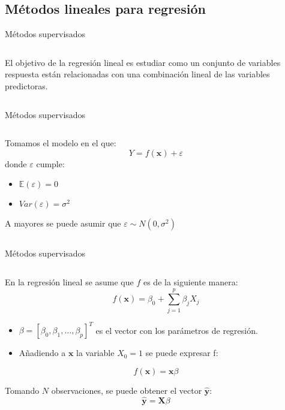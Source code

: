 \subsection{Métodos lineales para regresión}
\begin{frame}{Métodos supervisados}
\begin{columns}
\begin{column}{0.9\textwidth}
El objetivo de la regresión lineal es estudiar como un conjunto de variables respuesta están relacionadas con una combinación lineal de las variables predictoras. 
\end{column}
\end{columns}
\end{frame}

\begin{frame}{Métodos supervisados}
\begin{columns}
\begin{column}{0.9\textwidth}
Tomamos el modelo en el que: 
\begin{equation}
Y=f(\mathbf{x})+\varepsilon
\end{equation}
donde $\varepsilon$ cumple:
\begin{itemize}
\item $\mathbb{E}(\varepsilon)=0$
\item $Var(\varepsilon)=\sigma^2$
\end{itemize}
A mayores se puede asumir que $\varepsilon\sim N(0,\sigma^2)$
\end{column}
\end{columns}
\end{frame}

\begin{frame}{Métodos supervisados}
\begin{columns}
\begin{column}{0.9\textwidth}
En la regresión lineal se asume que $f$ es de la siguiente manera:
\begin{equation}
f(\mathbf{x})=\beta_0+\sum_{j=1}^p \beta_j X_j
\end{equation}
\begin{itemize}
\item $\beta=[\beta_0,\beta_1,\ldots,\beta_p]^T$ es el vector con los parámetros de regresión.
\item Añadiendo a $\mathbf{x}$ la variable $X_0=1$ se puede expresar f: 
\end{itemize}

\begin{equation}
f(\mathbf{x})=\mathbf{x}\beta
\end{equation}

Tomando $N$ observaciones, se puede obtener el vector $\mathbf{\hat{y}}$:
\begin{equation}
\mathbf{\hat{y}}=\mathbf{X}\beta
\end{equation}

\end{column}
\end{columns}
\end{frame}


